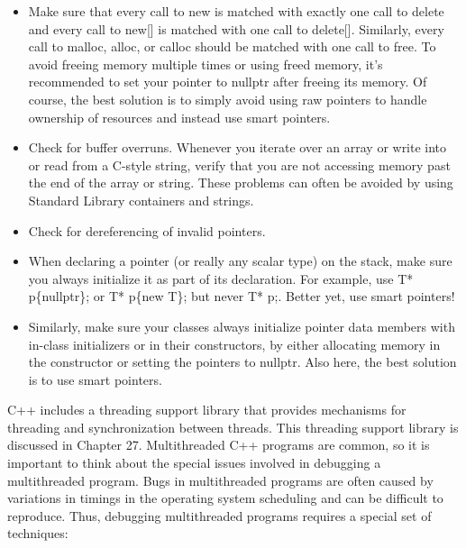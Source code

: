 \begin{itemize}
\item
Make sure that every call to new is matched with exactly one call to delete and every call to new[] is matched with one call to delete[]. Similarly, every call to malloc, alloc, or calloc should be matched with one call to free. To avoid freeing memory multiple times or using freed memory, it’s recommended to set your pointer to nullptr after freeing its memory. Of course, the best solution is to simply avoid using raw pointers to handle ownership of resources and instead use smart pointers.

\item
Check for buffer overruns. Whenever you iterate over an array or write into or read from a C-style string, verify that you are not accessing memory past the end of the array or string. These problems can often be avoided by using Standard Library containers and strings.

\item
Check for dereferencing of invalid pointers.

\item
When declaring a pointer (or really any scalar type) on the stack, make sure you always initialize it as part of its declaration. For example, use T* p\{nullptr\}; or T* p\{new T\}; but never T* p;. Better yet, use smart pointers!

\item
Similarly, make sure your classes always initialize pointer data members with in-class initializers or in their constructors, by either allocating memory in the constructor or setting the pointers to nullptr. Also here, the best solution is to use smart pointers.
\end{itemize}



C++ includes a threading support library that provides mechanisms for threading and synchronization between threads. This threading support library is discussed in Chapter 27. Multithreaded C++ programs are common, so it is important to think about the special issues involved in debugging a multithreaded program. Bugs in multithreaded programs are often caused by variations in timings in the operating system scheduling and can be difficult to reproduce. Thus, debugging multithreaded programs requires a special set of techniques:

